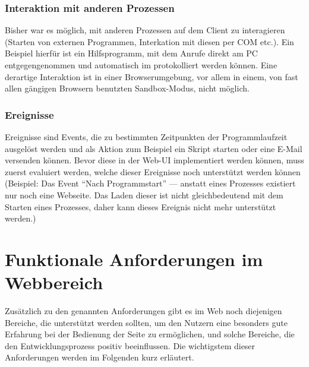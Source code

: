 \subsubsection{Interaktion mit anderen Prozessen}
 Bisher war es möglich, mit anderen Prozessen auf dem Client zu interagieren (Starten von externen Programmen, Interkation mit diesen per \gls{COM} etc.). Ein Beispiel hierfür ist ein Hilfsprogramm, mit dem Anrufe direkt am PC entgegengenommen und automatisch im  protokolliert werden können. Eine derartige Interaktion ist in einer Browserumgebung, vor allem in einem, von fast allen gängigen Browsern benutzten Sandbox-Modus, nicht möglich.

\subsubsection{Ereignisse} 
Ereignisse sind Events, die zu bestimmten Zeitpunkten der Programmlaufzeit ausgelöst werden und als Aktion zum Beispiel ein Skript starten oder eine E-Mail versenden können. Bevor diese in der Web-UI implementiert werden können, muss zuerst evaluiert werden, welche dieser Ereignisse noch unterstützt werden können (Beispiel: Das Event \enquote{Nach Programmstart} --- anstatt eines Prozesses existiert nur noch eine Webseite. Das Laden dieser ist nicht gleichbedeutend mit dem Starten eines Prozesses, daher kann dieses Ereignis nicht mehr unterstützt werden.)

\section{Funktionale Anforderungen im Webbereich}
Zusätzlich zu den genannten Anforderungen gibt es im Web noch diejenigen Bereiche, die unterstützt werden sollten, um den Nutzern eine besonders gute Erfahrung bei der Bedienung der Seite zu ermöglichen, und solche Bereiche, die den Entwicklungsprozess positiv beeinflussen. Die wichtigstem dieser Anforderungen werden im Folgenden kurz erläutert. 

